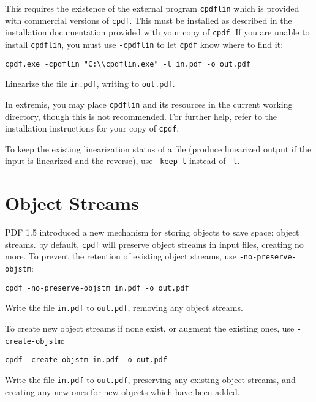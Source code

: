 \documentclass{book}
\begin{document}
\noindent This requires the existence of the external program \texttt{cpdflin} which is provided with commercial versions of \texttt{cpdf}. This must be installed as described in the installation documentation provided with your copy of \texttt{cpdf}. If you are unable to install \texttt{cpdflin}, you must use \texttt{-cpdflin} to let \texttt{cpdf} know where to find it:

\begin{framed}
\small\verb!cpdf.exe -cpdflin "C:\\cpdflin.exe" -l in.pdf -o out.pdf!

\vspace{2.5mm}
\noindent Linearize the file \texttt{in.pdf}, writing to \texttt{out.pdf}.
\end{framed}

In extremis, you may place \texttt{cpdflin} and its resources in the current working directory, though this is not recommended. For further help, refer to the installation instructions for your copy of \texttt{cpdf}.

To keep the existing linearization status of a file (produce linearized output if the input is linearized and the reverse), use \texttt{-keep-l} instead of \texttt{-l}.

\section{Object Streams}
PDF 1.5 introduced a new mechanism for storing objects to save space: object streams. by default, \texttt{cpdf} will preserve object streams in input files, creating no more. To prevent the retention of existing object streams, use \texttt{-no-preserve-objstm}:

\begin{framed}
\small\verb!cpdf -no-preserve-objstm in.pdf -o out.pdf!

\vspace{2.5mm}
\noindent Write the file \texttt{in.pdf} to \texttt{out.pdf}, removing any object streams.
\end{framed}

\noindent To create new object streams if none exist, or augment the existing ones, use \texttt{-create-objstm}:

\begin{framed}
\small\verb!cpdf -create-objstm in.pdf -o out.pdf!

\vspace{2.5mm}
\noindent Write the file \texttt{in.pdf} to \texttt{out.pdf}, preserving any existing object streams, and creating any new ones for new objects which have been added.
\end{framed}
\end{document}
